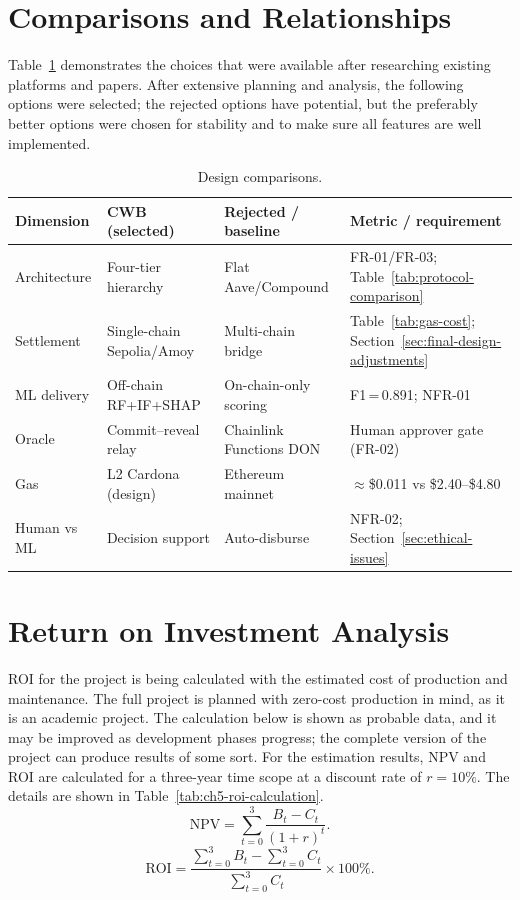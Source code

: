 \section{Comparisons and Relationships}
\label{sec:comparisons-relationships}

Table~\ref{tab:comparison-relationships} demonstrates the choices that were available after researching existing platforms and papers. After extensive planning and analysis, the following options were selected; the rejected options have potential, but the preferably better options were chosen for stability and to make sure all features are well implemented.

\begin{table}[H]
\centering
\caption[Design comparisons]{Design comparisons.}
\label{tab:comparison-relationships}
\footnotesize
\begin{tabular}{@{}p{2.4cm}p{2.8cm}p{2.8cm}p{5.2cm}@{}}
\toprule
\tableheadcolor
\textbf{Dimension} & \textbf{CWB (selected)} & \textbf{Rejected / baseline} & \textbf{Metric / requirement} \\
\midrule
Architecture & Four-tier hierarchy & Flat Aave/Compound & FR-01/FR-03; Table~\ref{tab:protocol-comparison} \\
Settlement & Single-chain Sepolia/Amoy & Multi-chain bridge & Table~\ref{tab:gas-cost}; Section~\ref{sec:final-design-adjustments} \\
ML delivery & Off-chain RF+IF+SHAP & On-chain-only scoring & F1\,=\,0.891; NFR-01 \\
Oracle & Commit--reveal relay & Chainlink Functions DON & Human approver gate (FR-02) \\
Gas & L2 Cardona (design) & Ethereum mainnet & ${\approx}$\$0.011 vs \$2.40--\$4.80 \\
Human vs ML & Decision support & Auto-disburse & NFR-02; Section~\ref{sec:ethical-issues} \\
\bottomrule
\end{tabular}
\end{table}

\section{Return on Investment Analysis}
\label{sec:ch5-roi}

ROI for the project is being calculated with the estimated cost of production and maintenance. The full project is planned with zero-cost production in mind, as it is an academic project. The calculation below is shown as probable data, and it may be improved as development phases progress; the complete version of the project can produce results of some sort. For the estimation results, NPV and ROI are calculated for a three-year time scope at a discount rate of $r=10\%$. The details are shown in Table~\ref{tab:ch5-roi-calculation}.
\[
\mathrm{NPV}=\sum_{t=0}^{3}\frac{B_t-C_t}{(1+r)^t}.
\]
\[
\mathrm{ROI}=\frac{\sum_{t=0}^{3}B_t-\sum_{t=0}^{3}C_t}{\sum_{t=0}^{3}C_t}\times 100\%.
\]

